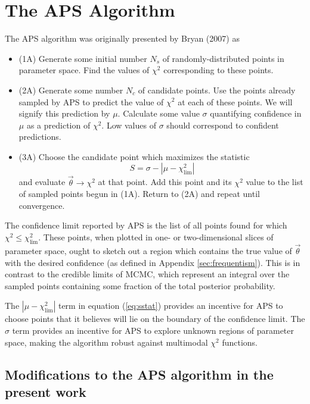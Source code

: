 \documentclass[useAMS,usenatbib]{aastex}
\begin{document}
\section{The APS Algorithm}
\label{sec:algorithm}

The APS algorithm was originally presented by Bryan (2007) as

\begin{itemize}
\item(1A) Generate some initial number $N_s$ of randomly-distributed points in 
parameter space.  Find the values of $\chi^2$ corresponding to these points.
\\
\item(2A) Generate some number $N_c$ of candidate points.  Use the points
already sampled by APS to predict the value of $\chi^2$ at each of these points.
 We will signify this prediction by $\mu$.  Calculate some value $\sigma$
 quantifying confidence in $\mu$ as a prediction of $\chi^2$.  Low values of
 $\sigma$ should correspond to confident predictions.
 \\
\item(3A) Choose the candidate point which maximizes the statistic
\begin{equation}
\label{eq:sstat}
S=\sigma-|\mu-\chi^2_\text{lim}|
\end{equation}
and evaluate $\vec{\theta}\rightarrow\chi^2$ at that point.  Add this point and
its $\chi^2$ value to the list of sampled points begun in (1A). 
Return to (2A) and repeat until convergence.
\\
\end{itemize}
The confidence limit reported by APS is the list of all points found
for which $\chi^2\le\chi^2_\text{lim}$.  
These points, when plotted in one- or two-dimensional slices of parameter
space, ought to sketch out a region which contains the true value of $\vec{\theta}$
with the desired confidence (as defined in Appendix \ref{sec:frequentism}).
This is in contrast to the credible
limits of MCMC, which represent an integral over the sampled points containing some
fraction of the total posterior probability.

The $|\mu-\chi^2_\text{lim}|$ term in equation (\ref{eq:sstat}) provides an
incentive for APS to choose points that it believes will lie on the boundary of
the confidence limit.  
The $\sigma$ term provides an incentive for APS to explore unknown regions of
parameter space, making the algorithm robust against multimodal $\chi^2$
functions.  

\subsection{Modifications to the APS algorithm in the present work}
\end{document}
